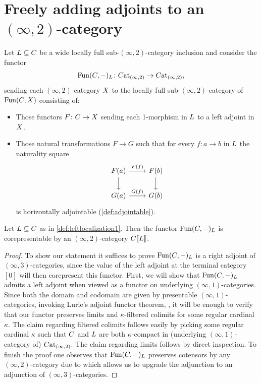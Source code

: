 \documentclass[a4paper,reqno,twoside]{amsart}
\begin{document}
\section{Freely adding adjoints to an $(\infty,2)$-category}


\begin{definition}\label{def:leftlocalization1}
	Let $\relax{L} \subseteq \relax{C}$ be a wide locally full sub-$(\infty,2)$-category inclusion and consider the functor
	\[
		\mathrm{Fun}(\relax{C},-)_{\relax{L}} \colon \relax{C}\mathrm{at}_{(\infty,2)} \to \relax{C}\mathrm{at}_{(\infty,2)},
	\]
	sending each $(\infty,2)$-category $\relax{X}$ to the locally full sub-$(\infty,2)$-category of $\mathrm{Fun}(\relax{C},\relax{X})$ consisting of:
	\begin{itemize}
		\item Those functors $F \colon \relax{C} \to \relax{X}$ sending each 1-morphism in $\relax{L}$ to a left adjoint in $\relax{X}$.
		\item Those natural transformations $F \to G$ such that for every $f \colon a \to b$ in $\relax{L}$ the naturality square
		\[
			\begin{tikzcd}
				F(a) \arrow[d] \arrow[r,"F(f)"] & F(b) \arrow[d] \\
				G(a) \arrow[r,"G(f)"] & G(b)
			\end{tikzcd}
		\]
		is horizontally adjointable (\cref{def:adjointable}).
	\end{itemize}
\end{definition}

\begin{proposition}\label{prop:softlocalization}
	Let $\relax{L}\subseteq \relax{C}$ as in \cref{def:leftlocalization1}. Then the functor $\mathrm{Fun}(\relax{C},-)_{\relax{L}}$ is corepresentable by an $(\infty,2)$-category $\relax{C}[\![\relax{L}]\!]$.
\end{proposition}
\begin{proof}
	To show our statement it suffices to prove $\mathrm{Fun}(\relax{C},-)_{\relax{L}}$ is a right adjoint of $(\infty,3)$-categories, since the value of the left adjoint at the terminal category $[0]$ will then corepresent this functor. First, we will show that $\mathrm{Fun}(\relax{C},-)_{\relax{L}}$ admits a left adjoint when viewed as a functor on underlying $(\infty,1)$-categories. Since both the domain and codomain are given by presentable $(\infty,1)$-categories, invoking Lurie's adjoint functor theorem, \cite[Corollary 5.5.2.9]{HTT}, it will be enough to verify that our functor preserves limits and $\kappa$-filtered colimits for some regular cardinal $\kappa$. The claim regarding filtered colimits follows easily by picking some regular cardinal $\kappa$ such that $\relax{C}$ and $\relax{L}$ are both $\kappa$-compact in (underlying $(\infty,1)$-category of) $\relax{C}\mathrm{at}_{(\infty,2)}$. The claim regarding limits follows by direct inspection. To finish the proof one observes that $\mathrm{Fun}(\relax{C},-)_{\relax{L}}$ preserves cotensors by any $(\infty,2)$-category due to \cite[Corollary 4.2.12]{AbellanGagnaea2025StraighteningLaxTransformations} which allows us to upgrade the adjunction to an adjunction of $(\infty,3)$-categories.
\end{proof}
\end{document}
